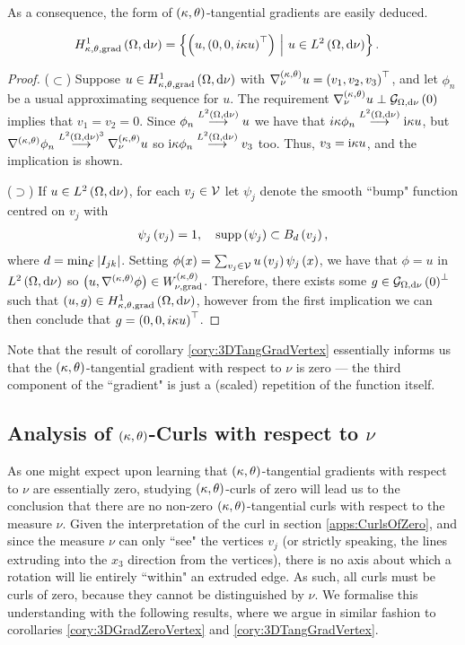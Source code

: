 As a consequence, the form of $\left( \kappa, \theta \right)$-tangential gradients are easily deduced.
\begin{cory} \label{cory:3DTangGradVertex}
	\begin{align*}
		H^1_{\kappa,\theta,\mathrm{grad}}\left( \Omega, \mathrm{d}\nu \right) &=
		 \left\{  \left(  u, \left( 0,0, i\kappa u \right)^\top \right) \ \middle\vert \  u\in L^{2}\left( \Omega,\mathrm{d}\nu \right)  \right\}.
	\end{align*}
\end{cory}
\begin{proof}
	($\subset$) Suppose $u\in H^1_{\kappa,\theta,\mathrm{grad}}\left( \Omega, \mathrm{d}\nu \right)$ with $\nabla^{\left( \kappa, \theta \right)}_{\nu}u=\left( v_1,v_2,v_3 \right)^\top$, and let $\phi_n$ be a usual approximating sequence for $u$.
	The requirement $\nabla^{\left( \kappa, \theta \right)}_{\nu}u \perp \mathcal{G}_{ \Omega, \mathrm{d}\nu}\left( 0 \right)$ implies that $v_1 = v_2 = 0$.
	Since $\phi_n\overset{L^{2}\left( \Omega,\mathrm{d}\nu \right)}{\longrightarrow}u$ we have that $i\kappa\phi_n\overset{L^{2}\left( \Omega,\mathrm{d}\nu \right)}{\longrightarrow} \mathrm{i}\kappa u$, but $\nabla^{\left( \kappa, \theta \right)}\phi_n\overset{L^{2}\left( \Omega,\mathrm{d}\nu \right)^3}{\longrightarrow}\nabla^{\left( \kappa, \theta \right)}_{\nu}u$ so $\mathrm{i}\kappa\phi_n\overset{L^{2}\left( \Omega,\mathrm{d}\nu \right)}{\longrightarrow} v_3$ too.
	Thus, $v_3 = \mathrm{i}\kappa u$, and the implication is shown.

	($\supset$) If $u\in L^{2}\left( \Omega,\mathrm{d}\nu \right)$, for each $v_j\in\mathcal{V}$ let $\psi_j$ denote the smooth ``bump" function centred on $v_j$ with
	\begin{align*}
		\psi_j\left( v_j \right) = 1, \quad
		\mathrm{supp}\left( \psi_j \right) \subset B_d\left( v_j \right),
	\end{align*}
	where $d=\min_{\mathcal{E}}\left\lvert I_{jk} \right\rvert$.
	Setting $\phi(x) = \sum_{v_j\in\mathcal{V}}u\left( v_j \right)\psi_j\left( x \right)$, we have that $\phi=u$ in $L^{2}\left( \Omega,\mathrm{d}\nu \right)$ so $\left( u,\nabla^{\left( \kappa, \theta \right)}\phi \right)\in W^{\left( \kappa, \theta \right)}_{\nu,\mathrm{grad}}$.
	Therefore, there exists some $g\in\mathcal{G}_{ \Omega, \mathrm{d}\nu}\left( 0 \right)^{\perp}$ such that $\left( u,g \right)\in H^1_{\kappa,\theta,\mathrm{grad}}\left( \Omega, \mathrm{d}\nu \right)$, however from the first implication we can then conclude that $g = \left( 0,0, i\kappa u \right)^\top$.
\end{proof}
Note that the result of corollary \ref{cory:3DTangGradVertex} essentially informs us that the $\left( \kappa, \theta \right)$-tangential gradient with respect to $\nu$ is zero --- the third component of the ``gradient" is just a (scaled) repetition of the function itself.

\subsection{Analysis of $\left( \kappa, \theta \right)$-Curls with respect to $\nu$} \label{apps:VertexCurls}
As one might expect upon learning that $\left( \kappa, \theta \right)$-tangential gradients with respect to $\nu$ are essentially zero, studying $\left( \kappa, \theta \right)$-curls of zero will lead us to the conclusion that there are no non-zero $\left( \kappa, \theta \right)$-tangential curls with respect to the measure $\nu$.
Given the interpretation of the curl in section \ref{apps:CurlsOfZero}, and since the measure $\nu$ can only ``see" the vertices $v_j$ (or strictly speaking, the lines extruding into the $x_3$ direction from the vertices), there is no axis about which a rotation will lie entirely ``within" an extruded edge.
As such, all curls must be curls of zero, because they cannot be distinguished by $\nu$.
We formalise this understanding with the following results, where we argue in similar fashion to corollaries \ref{cory:3DGradZeroVertex} and \ref{cory:3DTangGradVertex}.

